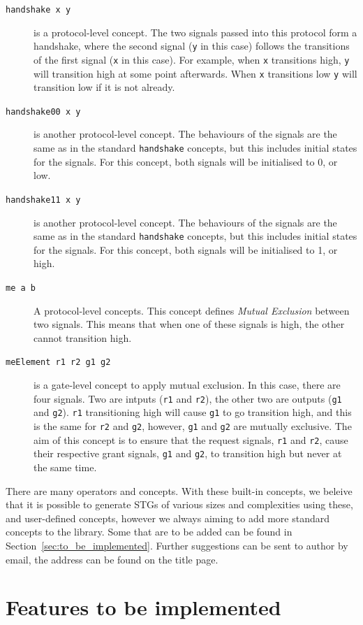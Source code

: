 \documentclass{proc}
\begin{document}
\begin{description}
  \item [\texttt{handshake x y}] is a protocol-level concept. The two signals passed into this protocol form a handshake, where the second signal (\texttt{y} in this case) follows the 
  transitions of the first signal (\texttt{x} in this case). For example, when \texttt{x} transitions high, \texttt{y} will transition high at some point afterwards. When \texttt{x} transitions low
  \texttt{y} will transition low if it is not already.
  
  \item [\texttt{handshake00 x y}] is another protocol-level concept. The behaviours of the signals are the same as in the standard \texttt{handshake} concepts, but this includes initial 
  states for the signals. For this concept, both signals will be initialised to 0, or low.
  
  \item [\texttt{handshake11 x y}] is another protocol-level concept. The behaviours of the signals are the same as in the standard \texttt{handshake} concepts, but this includes initial 
  states for the signals. For this concept, both signals will be initialised to 1, or high.
  
  \item [\texttt{me a b}] A protocol-level concepts. This concept defines \emph{Mutual Exclusion} between two signals. This means that when one of these signals is high, the other cannot 
  transition high.
  
  \item [\texttt{meElement r1 r2 g1 g2}] is a gate-level concept to apply mutual exclusion. In this case, there are four signals. Two are intputs (\texttt{r1} and \texttt{r2}), the other two 
  are outputs (\texttt{g1} and \texttt{g2}). \texttt{r1} transitioning high will cause \texttt{g1} to go transition high, and this is the same for \texttt{r2} and \texttt{g2}, however,
  \texttt{g1} and \texttt{g2} are mutually exclusive. The aim of this concept is to ensure that the request signals, \texttt{r1} and \texttt{r2}, cause their respective grant signals, 
  \texttt{g1} and \texttt{g2}, to transition high but never at the same time. 
  
\end{description}

There are many operators and concepts. With these built-in concepts, we beleive that it is possible to generate STGs of various sizes and complexities using these, and user-defined 
concepts, however we always aiming to add more standard concepts to the library. Some that are to be added can be found in Section~\ref{sec:to_be_implemented}. Further suggestions
can be sent to author by email, the address can be found on the title page. 

\section{Features to be implemented \label{sec:to_be_implemented}}

\newpage


\end{document}
